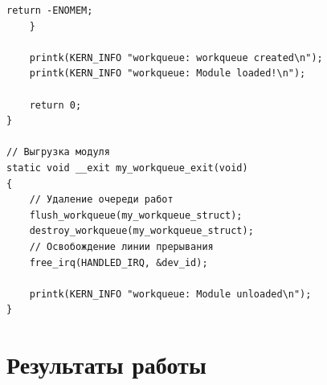\begin{lstlisting}[caption={}]
        return -ENOMEM;
    }

    printk(KERN_INFO "workqueue: workqueue created\n");
    printk(KERN_INFO "workqueue: Module loaded!\n");

    return 0;
}

// Выгрузка модуля
static void __exit my_workqueue_exit(void)
{
    // Удаление очереди работ
    flush_workqueue(my_workqueue_struct);
    destroy_workqueue(my_workqueue_struct);
    // Освобождение линии прерывания
    free_irq(HANDLED_IRQ, &dev_id);

    printk(KERN_INFO "workqueue: Module unloaded\n");
}
\end{lstlisting}

\section{Результаты работы}

